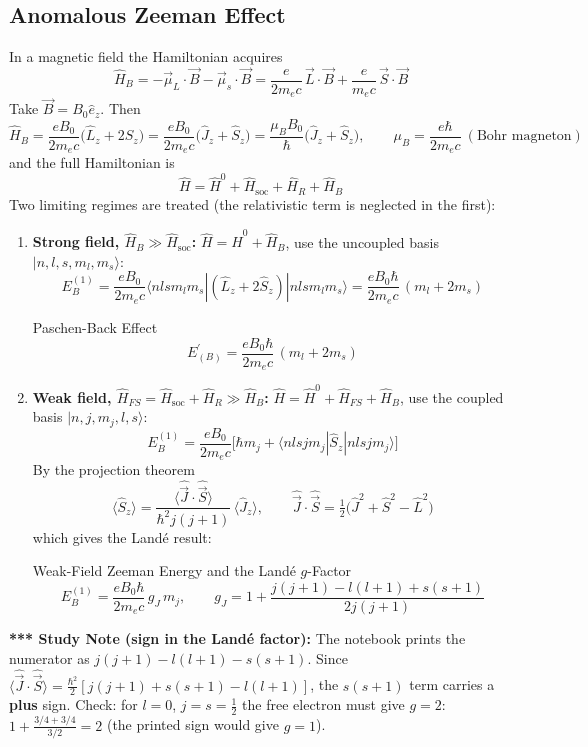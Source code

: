 \documentclass[11pt,a4paper]{article}
\begin{document}
\subsection{Anomalous Zeeman Effect}
In a magnetic field the Hamiltonian acquires
\[
\hat H_B = -\vec\mu_L\cdot\vec B - \vec\mu_s\cdot\vec B = \frac{e}{2m_ec}\,\vec L\cdot\vec B + \frac{e}{m_ec}\,\vec S\cdot\vec B
\]
Take $\vec B = B_0\hat e_z$. Then
\[
\hat H_B = \frac{eB_0}{2m_ec}\big(\hat L_z + 2\hat S_z\big) = \frac{eB_0}{2m_ec}\big(\hat J_z + \hat S_z\big) = \frac{\mu_BB_0}{\hbar}\big(\hat J_z+\hat S_z\big), \qquad \mu_B = \frac{e\hbar}{2m_ec}\ (\text{Bohr magneton})
\]
and the full Hamiltonian is
\[
\boxed{\hat H = \hat H^0 + \hat H_{\text{soc}} + \hat H_R + \hat H_B}
\]
Two limiting regimes are treated (the relativistic term is neglected in the first):
\begin{enumerate}
    \item \textbf{Strong field, $\hat H_B \gg \hat H_{\text{soc}}$:} $\hat H = \hat H^0+\hat H_B$, use the uncoupled basis $|n,l,s,m_l,m_s\rangle$:
    \[
    E^{(1)}_B = \frac{eB_0}{2m_ec}\langle n l s m_l m_s|(\hat L_z+2\hat S_z)|n l s m_l m_s\rangle = \frac{eB_0\hbar}{2m_ec}\,(m_l+2m_s)
    \]
    \begin{thm}{Paschen-Back Effect}
    \[
    E^{\prime}_{(B)} = \frac{eB_0\hbar}{2m_ec}\,(m_l + 2m_s)
    \]
    \end{thm}
    \item \textbf{Weak field, $\hat H_{FS}=\hat H_{\text{soc}}+\hat H_R \gg \hat H_B$:} $\hat H = \hat H^0+\hat H_{FS}+\hat H_B$, use the coupled basis $|n,j,m_j,l,s\rangle$:
    \[
    E^{(1)}_B = \frac{eB_0}{2m_ec}\Big[\hbar m_j + \langle n l s j m_j|\hat S_z|n l s j m_j\rangle\Big]
    \]
    By the projection theorem
    \[
    \langle\hat S_z\rangle = \frac{\langle\hat{\vec J}\cdot\hat{\vec S}\rangle}{\hbar^2j(j+1)}\,\langle\hat J_z\rangle, \qquad \hat{\vec J}\cdot\hat{\vec S} = \tfrac12\big(\hat J^2+\hat S^2-\hat L^2\big)
    \]
    which gives the Land\'e result:
    \begin{thm}{Weak-Field Zeeman Energy and the Land\'e $g$-Factor}
    \[
    E^{(1)}_B = \frac{eB_0\hbar}{2m_ec}\,g_J\,m_j, \qquad g_J = 1 + \frac{j(j+1) - l(l+1) + s(s+1)}{2j(j+1)}
    \]
    \end{thm}
\end{enumerate}
\textbf{*** Study Note (sign in the Land\'e factor):} The notebook prints the numerator as $j(j+1)-l(l+1)-s(s+1)$. Since $\langle\hat{\vec J}\cdot\hat{\vec S}\rangle = \frac{\hbar^2}{2}[j(j+1)+s(s+1)-l(l+1)]$, the $s(s+1)$ term carries a \textbf{plus} sign. Check: for $l=0$, $j=s=\tfrac12$ the free electron must give $g=2$: $1+\frac{3/4+3/4}{3/2}=2$ \checkmark (the printed sign would give $g=1$).
\end{document}
